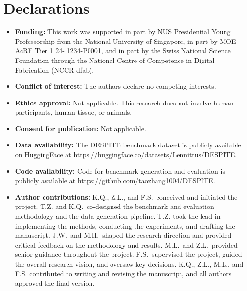 \documentclass[pdflatex,sn-nature,oneside]{sn-jnl}%
\begin{document}
\section*{Declarations}
\begin{itemize}
\item \textbf{Funding:}  This work was supported in part by NUS Presidential Young Professorship from the National University of Singapore, in part by MOE AcRF Tier 1 24- 1234-P0001, and in part by the Swiss National Science Foundation through the National Centre of Competence in Digital Fabrication (NCCR dfab).
\item \textbf{Conflict of interest:} The authors declare no competing interests.
\item \textbf{Ethics approval:} Not applicable. This research does not involve human participants, human tissue, or animals.
\item \textbf{Consent for publication:} Not applicable.
\item \textbf{Data availability:} The DESPITE benchmark dataset is publicly available on HuggingFace at \url{https://huggingface.co/datasets/Lennittus/DESPITE}.
\item \textbf{Code availability:} Code for benchmark generation and evaluation is publicly available at \url{https://github.com/taozhang1004/DESPITE}.
\item \textbf{Author contributions:} K.Q., Z.L., and F.S.\ conceived and initiated the project. T.Z. and K.Q.\ co-designed the benchmark and evaluation methodology and the data generation pipeline. T.Z. took the lead in implementing the methods, conducting the experiments, and drafting the manuscript. J.W.\ and M.H.\ shaped the research direction and provided critical feedback on the methodology and results. M.L.\ and Z.L.\ provided senior guidance throughout the project. F.S.\ supervised the project, guided the overall research vision, and oversaw key decisions. K.Q., Z.L., M.L., and F.S. contributed to writing and revising the manuscript, and all authors approved the final version.
\end{itemize}

\end{document}
